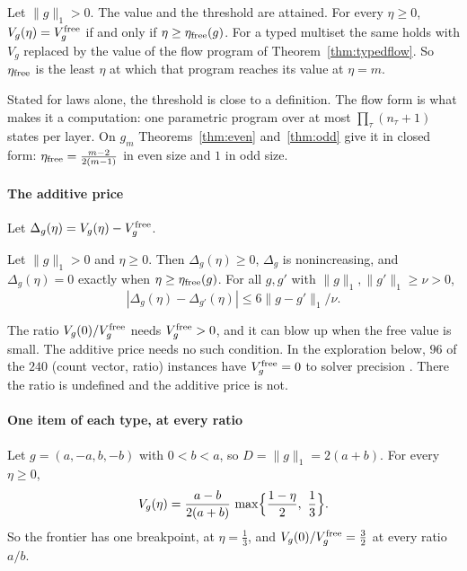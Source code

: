 \begin{theorem}
\label{thm:freeband}
Let $\|g\|_1>0$. The value and the threshold are attained. For every $\eta\ge0$,
$V_g(\eta)=V^{\rm free}_g$ if and only if $\eta\ge\eta_{\rm free}(g)$. For a typed multiset
the same holds with $V_g$ replaced by the value of the flow program of
Theorem~\ref{thm:typedflow}. So $\eta_{\rm free}$ is the least $\eta$ at which that program
reaches its value at $\eta=m$.
\end{theorem}

Stated for laws alone, the threshold is close to a definition. The flow form is what makes it a
computation: one parametric program over at most $\prod_\tau(n_\tau+1)$ states per layer. On
$g_m$ Theorems~\ref{thm:even} and~\ref{thm:odd} give it in closed form:
$\eta_{\rm free}=\frac{m-2}{2(m-1)}$ in even size and $1$ in odd size.

\paragraph{The additive price} Let $\Delta_g(\eta)=V_g(\eta)-V^{\rm free}_g$.

\begin{proposition}
\label{prop:gap}
Let $\|g\|_1>0$ and $\eta\ge0$. Then $\Delta_g(\eta)\ge0$, $\Delta_g$ is nonincreasing, and
$\Delta_g(\eta)=0$ exactly when $\eta\ge\eta_{\rm free}(g)$. For all $g,g'$ with
$\|g\|_1,\|g'\|_1\ge\nu>0$,
\[
|\Delta_g(\eta)-\Delta_{g'}(\eta)|\le6\|g-g'\|_1/\nu.
\]
\end{proposition}

The ratio $V_g(0)/V^{\rm free}_g$ needs $V^{\rm free}_g>0$, and it can blow up when the free
value is small. The additive price needs no such condition. In the exploration below, $96$ of the
$240$ (count vector, ratio) instances have $V^{\rm free}_g=0$ to solver precision \NUM. There the ratio is undefined and the
additive price is not.

\paragraph{One item of each type, at every ratio}
\begin{theorem}
\label{thm:twomag}
Let $g=(a,-a,b,-b)$ with $0<b<a$, so $D=\|g\|_1=2(a+b)$. For every $\eta\ge0$,
\[
V_g(\eta)=\frac{a-b}{2(a+b)}\,\max\Bigl\{\frac{1-\eta}2,\ \frac13\Bigr\}.
\]
So the frontier has one breakpoint, at $\eta=\frac13$, and $V_g(0)/V_g^{\rm free}=\frac32$ at
every ratio $a/b$.
\end{theorem}

